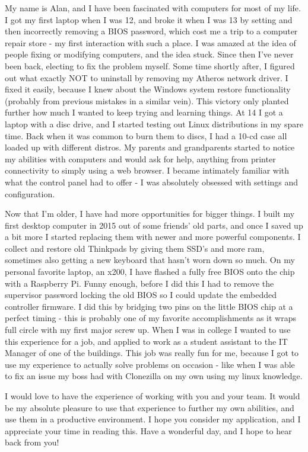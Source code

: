 \documentclass[11pt]{article}
\begin{document}
\pagestyle{empty} %


My name is Alan, and I have been fascinated with computers for most of my life.
I got my first laptop when I was 12, and broke it when I was 13 by setting and
then incorrectly removing a BIOS password, which cost me a trip to a computer
repair store - my first interaction with such a place. I was amazed at the idea
of people fixing or modifying computers, and the idea stuck. Since then I've
never been back, electing to fix the problem myself. Some time shortly after, I
figured out what exactly NOT to uninstall by removing my Atheros network
driver. I fixed it easily, because I knew about the Windows system restore
functionality (probably from previous mistakes in a similar vein). This victory
only planted further how much I wanted to keep trying and learning things. At
14 I got a laptop with a disc drive, and I started testing out Linux
distributions in my spare time. Back when it was common to burn them to discs,
I had a 10-cd case all loaded up with different distros. My parents and
grandparents started to notice my abilities with computers and would ask for
help, anything from printer connectivity to simply using a web browser. I
became intimately familiar with what the control panel had to offer - I was
absolutely obsessed with settings and configuration.

\medskip

Now that I'm older, I have had more opportunities for bigger things. I built my
first desktop computer in 2015 out of some friends' old parts, and once I saved
up a bit more I started replacing them with newer and more powerful components.
I collect and restore old Thinkpads by giving them SSD's and more ram,
sometimes also getting a new keyboard that hasn't worn down so much. On my
personal favorite laptop, an x200, I have flashed a fully free BIOS onto the
chip with a Raspberry Pi. Funny enough, before I did this I had to remove the
supervisor password locking the old BIOS so I could update the embedded
controller firmware. I did this by bridging two pins on the little BIOS chip at
a perfect timing - this is probably one of my favorite accomplishments as it
wraps full circle with my first major screw up. When I was in college I wanted
to use this experience for a job, and applied to work as a student assistant to
the IT Manager of one of the buildings. This job was really fun for me, because
I got to use my experience to actually solve problems on occasion - like when I
was able to fix an issue my boss had with Clonezilla on my own using my linux
knowledge.

\medskip

I would love to have the experience of working with you and your team. It would
be my absolute pleasure to use that experience to further my own abilities, and
use them in a productive environment. I hope you consider my application, and I
appreciate your time in reading this. Have a wonderful day, and I hope to hear
back from you!
\end{document}

